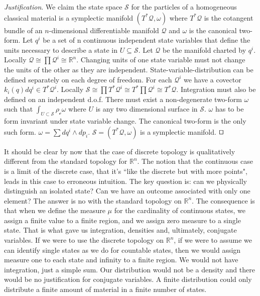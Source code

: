 \documentclass[smallextended]{svjour3}
\numberwithin{equation}{section}
\newenvironment{justification}{\emph{Justification}.}{\hfill\(\qed\)}
\theoremstyle{definition}
\newenvironment{justification}{\emph{Justification}.}{\qed}
\begin{document}
\begin{justification}
	We claim the state space $\mathcal{S}$ for the particles of a homogeneous classical material is a symplectic manifold $(T^*\mathcal{Q}, \omega)$ where $T^*\mathcal{Q}$ is the cotangent bundle of an $n$-dimensional differentiable manifold $\mathcal{Q}$ and $\omega$ is the canonical two-form. Let $q^i$ be a set of n continuous independent state variables that define the units necessary to describe a state in $U \subseteq \mathcal{S}$. Let $\mathcal{Q}$ be the manifold charted by $q^i$. Locally $\mathcal{Q} \cong \prod \mathcal{Q}^i \cong \mathbb{R}^n$. Changing units of one state variable must not change the units of the other as they are independent. State-variable-distribution can  be defined separately on each degree of freedom. For each $\mathcal{Q}^i$ we have a covector $k_i(q) dq^i \in T^*\mathcal{Q}^i$. Locally $\mathcal{S} \cong \prod T^*\mathcal{Q}^i \cong T^* \prod \mathcal{Q}^i \cong T^* \mathcal{Q}$. Integration must also be defined on an independent d.o.f. There must exist a non-degenerate two-form $\omega$ such that $\int_{U \subset \mathcal{S}} \rho_\mathcal{c} \omega$ where $U$ is any two dimensional surface in $\mathcal{S}$. $\omega$ has to be form invariant under state variable change. The canonical two-form is the only such form. $\omega = \sum dq^i \wedge dp_i$. $\mathcal{S} = (T^*\mathcal{Q}, \omega)$ is a symplectic manifold.
\end{justification}

It should be clear by now that the case of discrete topology is qualitatively different from the standard topology for $\mathbb{R}^n$. The notion that the continuous case is a limit of the discrete case, that it's ``like the discrete but with more points", leads in this case to erroneous intuition. The key question is: can we physically distinguish an isolated state? Can we have an outcome associated with only one element? The answer is no with the standard topology on $\mathbb{R}^n$. The consequence is that when we define the measure $\mu$ for the cardinality of continuous states, we assign a finite value to a finite region, and we assign zero measure to a single state. That is what gave us integration, densities and, ultimately, conjugate variables. If we were to use the discrete topology on $\mathbb{R}^n$, if we were to assume we can identify single states as we do for countable states, then we would assign measure one to each state and infinity to a finite region. We would not have integration, just a simple sum. Our distribution would not be a density and there would be no justification for conjugate variables. A finite distribution could only distribute a finite amount of material in a finite number of states.
\end{document}
